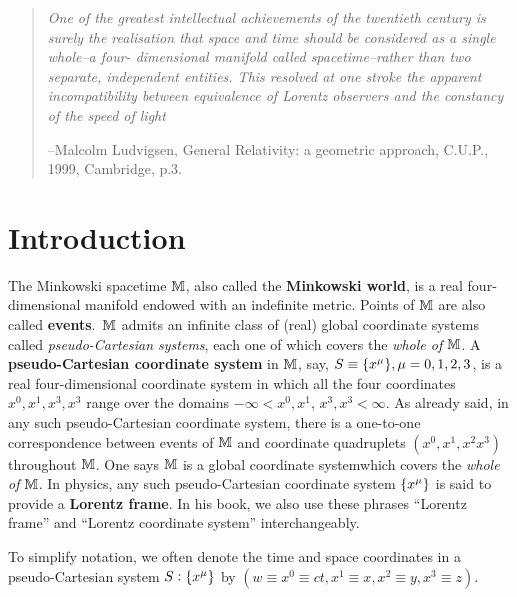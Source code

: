 \begin{quote}
\textsl{One of the greatest intellectual achievements of the 
twentieth century is surely the realisation that  space and 
time should be considered as a single whole--a four- 
dimensional manifold called  spacetime--rather than two 
separate, independent entities. This  resolved at one stroke 
the apparent incompatibility between equivalence of Lorentz  
observers and the constancy of the speed of light}

{\flushleft --{Malcolm Ludvigsen, {General Relativity: a 
geometric approach}, C.U.P., 1999, Cambridge, p.3.}}
\end{quote}

\newpage
\section{Introduction}

The Minkowski spacetime $\mathbb{M}$, also called the 
\textbf{Minkowski world}, is a real four-dimensional 
manifold endowed with an {indefinite metric}.  Points 
of  $\mathbb{M}$ are also called \textbf{events}. 
$\,\mathbb{M}$ admits an infinite class of (real)  global 
coordinate systems called  \textsl{pseudo-Cartesian 
systems}, each one of which covers the \textsl{whole 
of} $\mathbb{M}$. 
A \textbf{pseudo-Cartesian coordinate system} in 
$\mathbb{M}$, say, $S\equiv \{x^{{\mu}}\}, {\mu}=0,1,2,3$, is 
a real four-dimensional coordinate system in which all 
the four coordinates  $x^0, x^1, x^3, x^3$ range over 
the domains $-\infty < x^0, x^1$, $x^3, x^3< \infty$. As 
already said, in any such pseudo-Cartesian coordinate 
system, there is a one-to-one correspondence between 
events of $\mathbb{M}$ and coordinate quadruplets $(x^0, 
x^1,x^2x^3)$ throughout $\mathbb{M}$. One says $\mathbb{M}$ 
is a global  coordinate systemwhich covers the 
\textsl{whole of} $\mathbb{M}$.  In physics, any such    
pseudo-Cartesian coordinate system $\{x^{{\mu}}\}$ is said 
to provide a \textbf{Lorentz frame}. In his book, we 
also use these phrases ``Lorentz frame'' and ``Lorentz 
coordinate system'' interchangeably.

 
To simplify notation, we often denote the time and space 
coordinates  in a pseudo-Cartesian system $S:\{x^{{\mu}}\}$  
by $(w\equiv x^0 \equiv ct, x^1 \equiv x, x^2 \equiv  y, 
x^3 \equiv z)$.   
                                                  
